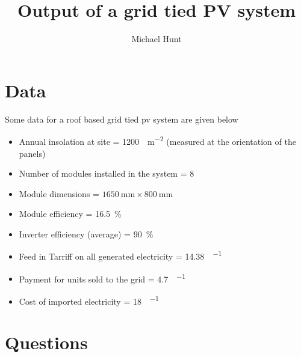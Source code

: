 \documentclass[crop=false,parskip=half]{scrartcl} %
\title{Output of a grid tied PV system}
\author{Michael Hunt}
\date{}
\begin{document}
\maketitle

\section*{Data}

Some data for a roof based grid tied pv system are given below
\begin{itemize}
\item Annual insolation at site = \SI{1200}{\kilowatthour\per\metre\squared}  (measured at the orientation of the panels)
\item	Number of modules installed in the system = 8
\item	Module dimensions = $\SI{1650}{\milli\metre}\times\SI{800}{\milli\metre}$
\item	Module efficiency = \SI{16.5}{\percent}
\item	Inverter efficiency (average) = \SI{90}{\percent}
\item	Feed in Tarriff on all generated electricity = \SI{14.38}{\pence\per\kilowatthour}
\item	Payment for units sold to the grid = \SI{4.7}{\pence\per\kilowatthour}
\item	Cost of imported electricity = \SI{18}{\pence\per\kilowatthour}
\end{itemize}

\section*{Questions}
\end{document}

